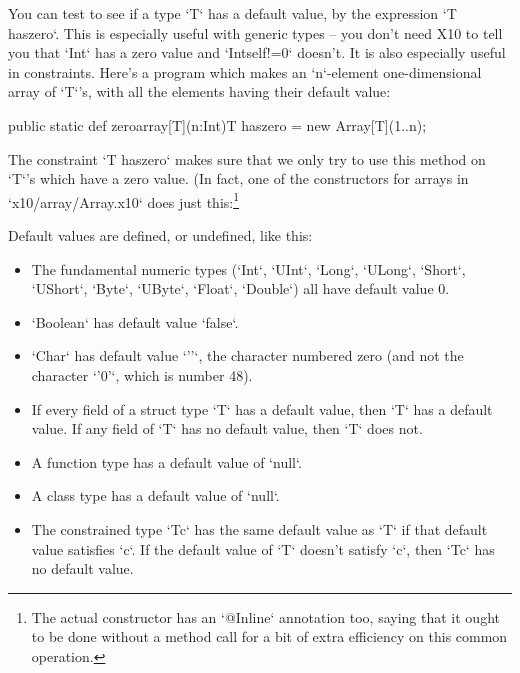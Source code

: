 You can test to see if a type \xcd`T` has a default value, by the expression 
\xcd`T haszero`.   This is especially useful with generic types -- you don't
need X10 to tell you that \xcd`Int` has a zero value and \xcd`Int{self!=0}`
doesn't.  It is also especially useful in constraints.  Here's a program which
makes an \xcd`n`-element one-dimensional array of \xcd`T`'s, with all the
elements having their default value:
\begin{xtennum}[]
public static def zeroarray[T](n:Int){T haszero} 
  = new Array[T](1..n);
\end{xtennum}
The constraint \xcd`{T haszero}` makes sure that we only try to use this
method on \xcd`T`'s which have a zero value.  (In fact, one of the
constructors for arrays in \xcd`x10/array/Array.x10` does just
this:\footnote{The actual constructor has an \xcd`@Inline` annotation too,
saying that it ought to be done without a method call for a bit of extra
efficiency on this common operation.}
\begin{xten}
public final class Array[T] {
    // [lots of stuff omitted] 
    public def this(size:int) {T haszero}
\end{xten}

Default values are defined, or undefined, like this:
\begin{itemize}
\item The fundamental numeric types (\xcd`Int`, \xcd`UInt`,
      \xcd`Long`, \xcd`ULong`, 
  \xcd`Short`, \xcd`UShort`, \xcd`Byte`,
   \xcd`UByte`, 
      \xcd`Float`, \xcd`Double`) all have default value 0.
\item \xcd`Boolean` has default value \xcd`false`.
\item \xcd`Char` has default value \xcd`'\0'`, the character numbered zero
      (and not the character \xcd`'0'`, which is number 48). 
\item If every field of a struct type \xcd`T` has a default value, then
      \xcd`T` has a default value.  If any field of \xcd`T` has no default
      value, then \xcd`T` does not. 
\item A function type has a default value of \xcd`null`.
\item A class type has a default value of \xcd`null`.
\item The constrained type \xcd`T{c}` has the same default value as \xcd`T` if
      that default value satisfies \xcd`c`.  If the default value of \xcd`T`
      doesn't satisfy \xcd`c`, then \xcd`T{c}` has no default value.
\end{itemize}

